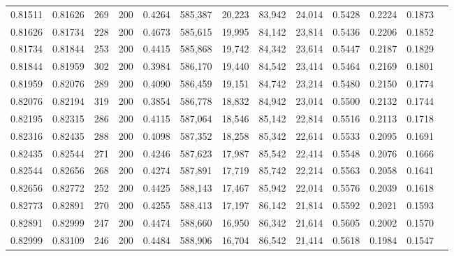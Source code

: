 \begin{tabular}{rrrrrrrrrrrrr}
0.81511 & 0.81626 &    269 & 200 &                                     0.4264 & 585,387 &  20,223 &  83,942 &  24,014 & 0.5428 & 0.2224 & 0.1873 \\
0.81626 & 0.81734 &    228 & 200 &                                     0.4673 & 585,615 &  19,995 &  84,142 &  23,814 & 0.5436 & 0.2206 & 0.1852 \\
0.81734 & 0.81844 &    253 & 200 &                                     0.4415 & 585,868 &  19,742 &  84,342 &  23,614 & 0.5447 & 0.2187 & 0.1829 \\
0.81844 & 0.81959 &    302 & 200 &                                     0.3984 & 586,170 &  19,440 &  84,542 &  23,414 & 0.5464 & 0.2169 & 0.1801 \\
0.81959 & 0.82076 &    289 & 200 &                                     0.4090 & 586,459 &  19,151 &  84,742 &  23,214 & 0.5480 & 0.2150 & 0.1774 \\
0.82076 & 0.82194 &    319 & 200 &                                     0.3854 & 586,778 &  18,832 &  84,942 &  23,014 & 0.5500 & 0.2132 & 0.1744 \\
0.82195 & 0.82315 &    286 & 200 &                                     0.4115 & 587,064 &  18,546 &  85,142 &  22,814 & 0.5516 & 0.2113 & 0.1718 \\
0.82316 & 0.82435 &    288 & 200 &                                     0.4098 & 587,352 &  18,258 &  85,342 &  22,614 & 0.5533 & 0.2095 & 0.1691 \\
0.82435 & 0.82544 &    271 & 200 &                                     0.4246 & 587,623 &  17,987 &  85,542 &  22,414 & 0.5548 & 0.2076 & 0.1666 \\
0.82544 & 0.82656 &    268 & 200 &                                     0.4274 & 587,891 &  17,719 &  85,742 &  22,214 & 0.5563 & 0.2058 & 0.1641 \\
0.82656 & 0.82772 &    252 & 200 &                                     0.4425 & 588,143 &  17,467 &  85,942 &  22,014 & 0.5576 & 0.2039 & 0.1618 \\
0.82773 & 0.82891 &    270 & 200 &                                     0.4255 & 588,413 &  17,197 &  86,142 &  21,814 & 0.5592 & 0.2021 & 0.1593 \\
0.82891 & 0.82999 &    247 & 200 &                                     0.4474 & 588,660 &  16,950 &  86,342 &  21,614 & 0.5605 & 0.2002 & 0.1570 \\
0.82999 & 0.83109 &    246 & 200 &                                     0.4484 & 588,906 &  16,704 &  86,542 &  21,414 & 0.5618 & 0.1984 & 0.1547 \\

\end{tabular}
